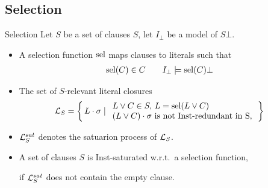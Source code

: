 \documentclass[%
handout,
]{beamer}
\begin{document}
\subsection{Selection}
\begin{frame}{Selection}
    Let $S$ be a set of clauses $S$, let $I_\bot$ be a model of $S\bot$.

    \vspace{0.7em}
    \begin{itemize}
        \item
    A selection function $\operatorname{sel}$ maps clauses to literals such that
    \begin{align*}
        \operatorname{sel}(C)&\in C
        &&&
        I_\bot&\models\operatorname{sel}(C)\bot
    \end{align*}

    \item
    The set of $S$-relevant literal closures
    \begin{align*}
        \mathcal{L}_S &= \left\{\, L\cdot\sigma \mid
        \begin{array}{l}
            L\lor C\in S,\,L = \operatorname{sel}(L\lor C)\\
            (L\lor C)\cdot\sigma\text{ is not Inst-redundant in S},\\
        \end{array}
        \,\right\}
    \end{align*}

    \item
    $\mathcal{L}_S^{sat}$ denotes the satuarion process of $\mathcal{L}_S$.

    \item A set of clauses $S$ is Inst-saturated w.r.t.~a selection function,
    
    if $\mathcal{L}_S^{sat}$ does not contain the empty clause.

    

\end{itemize}

\end{frame}
\end{document}
